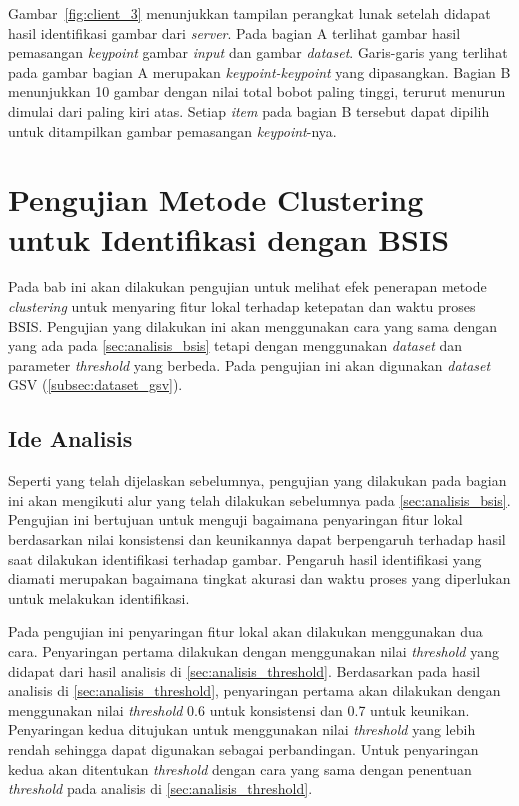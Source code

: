 Gambar~\ref{fig:client_3} menunjukkan tampilan perangkat lunak setelah didapat hasil identifikasi gambar dari \textit{server}. Pada bagian A terlihat gambar hasil pemasangan \textit{keypoint} gambar \textit{input} dan gambar \textit{dataset}. Garis-garis yang terlihat pada gambar bagian A merupakan \textit{keypoint-keypoint} yang dipasangkan. Bagian B menunjukkan 10 gambar dengan nilai total bobot paling tinggi, terurut menurun dimulai dari paling kiri atas. Setiap \textit{item} pada bagian B tersebut dapat dipilih untuk ditampilkan gambar pemasangan \textit{keypoint}-nya.

\section{Pengujian Metode Clustering untuk Identifikasi dengan BSIS}
Pada bab ini akan dilakukan pengujian untuk melihat efek penerapan metode \textit{clustering} untuk menyaring fitur lokal terhadap ketepatan dan waktu proses BSIS. Pengujian yang dilakukan ini akan menggunakan cara yang sama dengan yang ada pada \ref{sec:analisis_bsis} tetapi dengan menggunakan \textit{dataset} dan parameter \textit{threshold} yang berbeda. Pada pengujian ini akan digunakan \textit{dataset} GSV (\ref{subsec:dataset_gsv}).

\subsection{Ide Analisis}
Seperti yang telah dijelaskan sebelumnya, pengujian yang dilakukan pada bagian ini akan mengikuti alur yang telah dilakukan sebelumnya pada \ref{sec:analisis_bsis}. Pengujian ini bertujuan untuk menguji bagaimana penyaringan fitur lokal berdasarkan nilai konsistensi dan keunikannya dapat berpengaruh terhadap hasil saat dilakukan identifikasi terhadap gambar. Pengaruh hasil identifikasi yang diamati merupakan bagaimana tingkat akurasi dan waktu proses yang diperlukan untuk melakukan identifikasi.

Pada pengujian ini penyaringan fitur lokal akan dilakukan menggunakan dua cara. Penyaringan pertama dilakukan dengan menggunakan nilai \textit{threshold} yang didapat dari hasil analisis di \ref{sec:analisis_threshold}. Berdasarkan pada hasil analisis di \ref{sec:analisis_threshold}, penyaringan pertama akan dilakukan dengan menggunakan nilai \textit{threshold} 0.6 untuk konsistensi dan 0.7 untuk keunikan. Penyaringan kedua ditujukan untuk menggunakan nilai \textit{threshold} yang lebih rendah sehingga dapat digunakan sebagai perbandingan. Untuk penyaringan kedua akan ditentukan \textit{threshold} dengan cara yang sama dengan penentuan \textit{threshold} pada analisis di \ref{sec:analisis_threshold}. 

